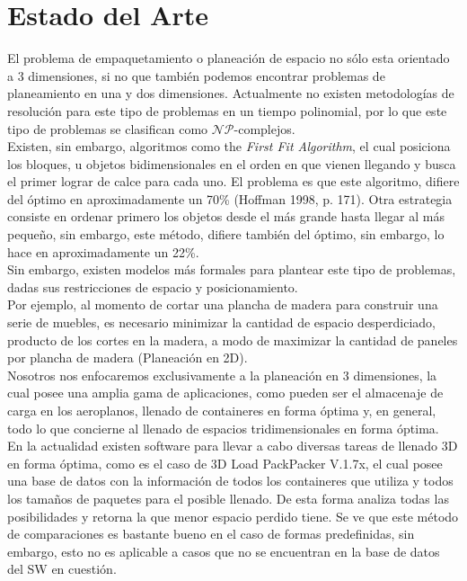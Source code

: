 \section{Estado del Arte\label{sec:estado_del_arte}}

El problema de empaquetamiento o planeación de espacio no sólo esta orientado
a 3 dimensiones, si no que también podemos encontrar problemas de planeamiento
en una y dos dimensiones. Actualmente no existen metodologías de resolución
para este tipo de problemas en un tiempo polinomial, por lo que este tipo
de problemas se clasifican como $\mathcal{NP}$-complejos. \\

Existen, sin embargo, algoritmos como the \textit{First Fit Algorithm}, el cual
posiciona los bloques, u objetos bidimensionales en el orden en que vienen
llegando y busca el primer lograr de calce para cada uno. El problema es que
este algoritmo, difiere del óptimo en aproximadamente un 70\% (Hoffman 1998, p. 171).
Otra estrategia consiste en ordenar primero los objetos desde el más grande
hasta llegar al más pequeño, sin embargo, este método, difiere también del
óptimo, sin embargo, lo hace en aproximadamente un 22\%. \\

Sin embargo, existen modelos más formales para plantear este tipo de problemas,
dadas sus restricciones de espacio y posicionamiento. \\

Por ejemplo, al momento de cortar una plancha de madera para construir una serie
de muebles, es necesario minimizar la cantidad de espacio desperdiciado,
producto de los cortes en la madera, a modo de maximizar la cantidad de
paneles por plancha de madera (Planeación en 2D). \\

Nosotros nos enfocaremos exclusivamente a la planeación en 3 dimensiones, la cual
posee una amplia gama de aplicaciones, como pueden ser el almacenaje de carga en
los aeroplanos, llenado de containeres en forma óptima y, en general, todo lo que
concierne al llenado de espacios tridimensionales en forma óptima. \\

En la actualidad existen software para llevar a cabo diversas tareas de llenado 3D
en forma óptima, como es el caso de 3D Load PackPacker V.1.7x, el cual posee una
base de datos con la información de todos los containeres que utiliza y todos los
tamaños de paquetes para el posible llenado. De esta forma analiza todas las
posibilidades y retorna la que menor espacio perdido tiene. Se ve que este método
de comparaciones es bastante bueno en el caso de formas predefinidas, sin embargo,
esto no es aplicable a casos que no se encuentran en la base de datos del SW en cuestión. \\

